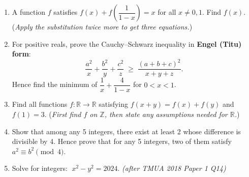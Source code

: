 \documentclass[11pt,a4paper]{article}
\begin{document}
\begin{enumerate}

\item A function $f$ satisfies $f(x) + f\!\left(\dfrac{1}{1-x}\right) = x$
      for all $x \neq 0, 1$.  Find $f(x)$.
      (\textit{Apply the substitution twice more to get three equations.})

\item For positive reals, prove the Cauchy--Schwarz inequality in \textbf{Engel (Titu) form}:
\[
  \frac{a^2}{x} + \frac{b^2}{y} + \frac{c^2}{z} \;\geq\; \frac{(a+b+c)^2}{x+y+z}.
\]
Hence find the minimum of $\dfrac{1}{x}+\dfrac{4}{1-x}$ for $0<x<1$.

\item Find all functions $f:\mathbb{R}\to\mathbb{R}$ satisfying
      $f(x+y) = f(x) + f(y)$ and $f(1) = 3$.
      (\textit{First find $f$ on $\mathbb{Z}$, then state any assumptions needed for $\mathbb{R}$.})

\item Show that among any 5 integers, there exist at least 2 whose difference is
      divisible by 4.  Hence prove that for any 5 integers, two of them satisfy
      $a^2 \equiv b^2 \pmod{4}$.

\item Solve for integers: $\;x^2 - y^2 = 2024$. \textit{\small(after TMUA 2018 Paper 1 Q14)}

\end{enumerate}

\end{document}

